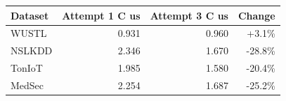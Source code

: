 \begin{tabular}{lrrr}
\toprule
Dataset & Attempt 1 C us & Attempt 3 C us & Change \\
\midrule
WUSTL & 0.931 & 0.960 & +3.1\% \\
NSLKDD & 2.346 & 1.670 & -28.8\% \\
TonIoT & 1.985 & 1.580 & -20.4\% \\
MedSec & 2.254 & 1.687 & -25.2\% \\
\bottomrule
\end{tabular}

